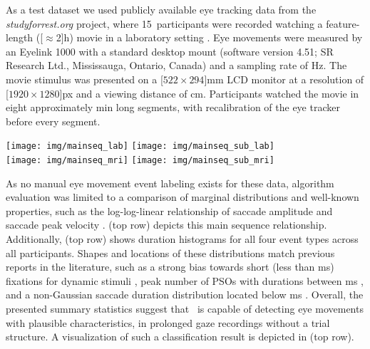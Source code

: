 As a test dataset we used publicly available eye tracking data from the
\textit{studyforrest.org} project, where 15~participants were recorded watching
a feature-length (\unit[$\approx$2]{h}) movie in a laboratory setting
\citep{Hanke2016}. Eye movements were measured by an Eyelink 1000 with a
standard desktop mount (software version 4.51; SR Research Ltd., Mississauga,
Ontario, Canada) and a sampling rate of \unit[1000]{Hz}. The movie stimulus was
presented on a \unit[$522\times294$]{mm} LCD monitor at a resolution of
\unit[$1920\times1280$]{px} and a viewing distance of \unit[85]{cm}. Participants
watched the movie in eight approximately \unit[15]{min} long segments,
with recalibration of the eye tracker before every segment.

\begin{figure*}[tbp]
  \texttt{[image: img/mainseq\_lab]}
  \texttt{[image: img/mainseq\_sub\_lab]} \\
  \texttt{[image: img/mainseq\_mri]}
  \texttt{[image: img/mainseq\_sub\_mri]}

  \caption{Main sequence of eye movement events during one 15 minute sequence of
  the movie (segment 2) for lab (top), and MRI participants (bottom). Data
  across all participants per dataset is shown on the left, and data for a single
  exemplary participant on the right.}

  \label{fig:overallComp}
\end{figure*}

As no manual eye movement event labeling exists for these data, algorithm
evaluation was limited to a comparison of marginal distributions and well-known
properties, such as the log-log-linear relationship of saccade amplitude and
saccade peak velocity \citep{bahill1975main}.  (top row)
depicts this main sequence relationship.
%
Additionally,  (top row) shows duration histograms for all four event
types across all participants. Shapes and locations of these distributions
match previous reports in the literature, such as a strong bias towards short
(less than \unit[500]{ms}) fixations for dynamic stimuli
\citep[Fig.~3]{dorr2010variability}, peak number of PSOs with durations between
\unit[10-20]{ms} \citep[Fig.~11]{Nystrom2010AnData}, and a non-Gaussian saccade
duration distribution located below \unit[100]{ms} \citep[Fig.~8, albeit for
static scene perception]{Nystrom2010AnData}.
%
Overall, the presented summary statistics suggest that \remodnav\ is capable
of detecting eye movements with plausible characteristics, in prolonged
gaze recordings without a trial structure. A visualization of such a classification
result is depicted in  (top row).

